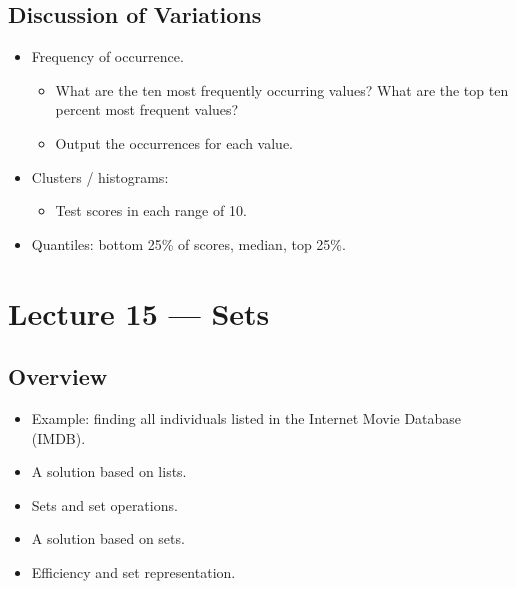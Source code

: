 \documentclass[letterpaper,10pt,english]{sphinxmanual}
\begin{document}
\section{Discussion of Variations}
\label{\detokenize{lecture_notes/lec14_design_part1:discussion-of-variations}}\begin{itemize}
\item {} 
Frequency of occurrence.
\begin{itemize}
\item {} 
What are the ten most frequently occurring values? What are the
top ten percent most frequent values?

\item {} 
Output the occurrences for each value.

\end{itemize}

\item {} 
Clusters / histograms:
\begin{itemize}
\item {} 
Test scores in each range of 10.

\end{itemize}

\item {} 
Quantiles: bottom 25\% of scores, median, top 25\%.

\end{itemize}


\chapter{Lecture 15 — Sets}
\label{\detokenize{lecture_notes/lec15_sets:lecture-15-sets}}\label{\detokenize{lecture_notes/lec15_sets::doc}}

\section{Overview}
\label{\detokenize{lecture_notes/lec15_sets:overview}}\begin{itemize}
\item {} 
Example: finding all individuals listed in the Internet Movie
Database (IMDB).

\item {} 
A solution based on lists.

\item {} 
Sets and set operations.

\item {} 
A solution based on sets.

\item {} 
Efficiency and set representation.

\end{itemize}
\end{document}
